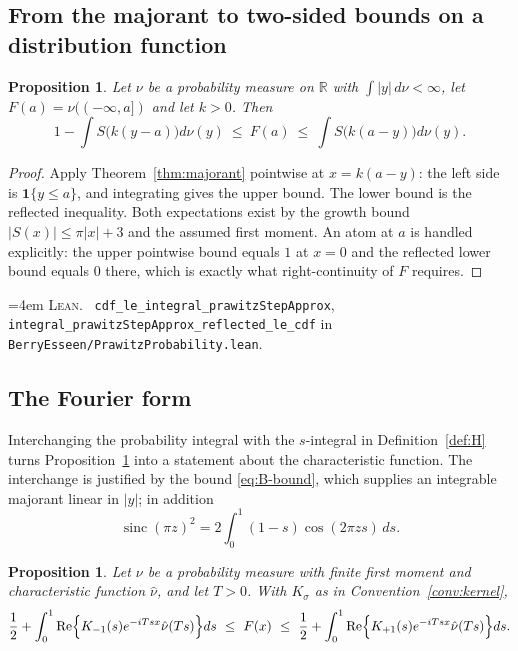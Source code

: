 \documentclass[10pt,a4paper]{article}
\theoremstyle{plain}
\newtheorem{proposition}[theorem]{Proposition}
\theoremstyle{definition}
\newcommand{\R}{\mathbb{R}}
\newcommand{\lean}[1]{\texttt{#1}}
\newcommand{\file}[1]{\texttt{#1}}
\DeclareMathOperator{\sinc}{sinc}
\DeclareMathOperator{\Rea}{Re}
\newenvironment{leanref}%
  {\par\addvspace{3pt}\begingroup\sloppy\emergencystretch=4em
   \noindent\footnotesize\textsc{Lean.}\ \ignorespaces}%
  {\par\endgroup\addvspace{3pt}}
\begin{document}
\subsection{From the majorant to two-sided bounds on a distribution function}

\begin{proposition}\label{prop:prawitz-prob}
Let $\nu$ be a probability measure on $\R$ with $\int|y|\,d\nu<\infty$, let
$F(a)=\nu(({-\infty},a])$ and let $k>0$. Then
\[
  1 - \int S\bigl(k(y-a)\bigr)d\nu(y)
  \ \le\ F(a) \ \le\
  \int S\bigl(k(a-y)\bigr)d\nu(y).
\]
\end{proposition}

\begin{proof}
Apply Theorem~\ref{thm:majorant} pointwise at $x=k(a-y)$: the left side is
$\mathbf 1\{y\le a\}$, and integrating gives the upper bound. The lower bound is
the reflected inequality. Both expectations exist by the growth bound
$|S(x)|\le\pi|x|+3$ and the assumed first moment. An atom at $a$ is handled
explicitly: the upper pointwise bound equals $1$ at $x=0$ and the reflected
lower bound equals $0$ there, which is exactly what right-continuity of $F$
requires.
\end{proof}

\begin{leanref}
\lean{cdf\_le\_integral\_prawitzStepApprox},
\lean{integral\_prawitzStepApprox\_reflected\_le\_cdf} in
\file{BerryEsseen/PrawitzProbability.lean}.
\end{leanref}

\subsection{The Fourier form}

Interchanging the probability integral with the $s$-integral in
Definition~\ref{def:H} turns Proposition~\ref{prop:prawitz-prob} into a
statement about the characteristic function. The interchange is justified by
the bound \eqref{eq:B-bound}, which supplies an integrable majorant linear in
$|y|$; in addition
\[
  \sinc(\pi z)^2 = 2\int_0^1(1-s)\cos(2\pi zs)\,ds .
\]

\begin{proposition}\label{prop:prawitz-fourier}
Let $\nu$ be a probability measure with finite first moment and characteristic
function $\hat\nu$, and let $T>0$. With $K_\sigma$ as in
Convention~\ref{conv:kernel},
\[
  \frac12+\int_0^1\Rea\Bigl\{K_{-1}(s)e^{-iTsx}\hat\nu(Ts)\Bigr\}ds
  \ \le\ F(x) \ \le\
  \frac12+\int_0^1\Rea\Bigl\{K_{+1}(s)e^{-iTsx}\hat\nu(Ts)\Bigr\}ds .
\]
\end{proposition}
\end{document}
